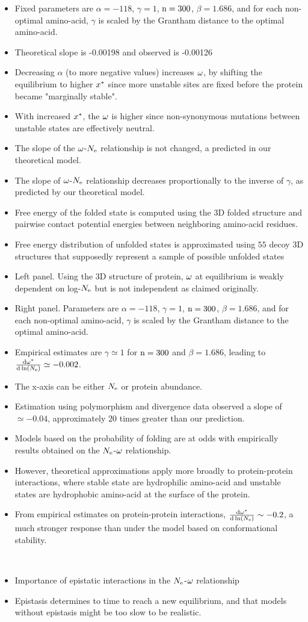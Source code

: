 \documentclass{article}
\begin{document}
\newpage
\begin{itemize}
	\item Fixed parameters are $\alpha=-118$, $\gamma=1$, $\text{n}=300$, $\beta=1.686$, and for each non-optimal amino-acid, $\gamma$ is scaled by the Grantham distance to the optimal amino-acid.
	\item Theoretical slope is -0.00198 and observed is -0.00126
	\item Decreasing $\alpha$ (to more negative values) increases $\omega$, by shifting the equilibrium to higher $x^{*}$ since more unstable sites are fixed before the protein became "marginally stable".  
	\item With increased $x^{*}$, the $\omega$ is higher since non-synonymous mutations between unstable states are effectively neutral.
	\item The slope of the $\omega$-$N_{\mathrm{e}}$ relationship is not changed, a predicted in our theoretical model.
	\item The slope of $\omega$-$N_{\mathrm{e}}$ relationship decreases proportionally to the inverse of $\gamma$, as predicted by our theoretical model.
	\item Free energy of the folded state is computed using the $3$D folded structure and pairwise contact potential energies between neighboring amino-acid residues.
	\item Free energy distribution of unfolded states is approximated using $55$ decoy $3$D structures that supposedly represent a sample of possible unfolded states
	\item Left panel. Using the 3D structure of protein, $\omega$ at equilibrium is weakly dependent on log-$N_{\mathrm{e}}$ but is not independent as claimed originally.
	\item Right panel. Parameters are $\alpha=-118$, $\gamma=1$, $\text{n}=300$, $\beta=1.686$, and for each non-optimal amino-acid, $\gamma$ is scaled by the Grantham distance to the optimal amino-acid.
	\item Empirical estimates are $\gamma \simeq 1$ for $\text{n}=300$ and $\beta=1.686$, leading to $\frac{ \mathrm{d} \omega^{*}}{\mathrm{d} \ln (N_{\mathrm{e}})} \simeq -0.002$.
	\item The x-axis can be either $N_{\mathrm{e}}$ or protein abundance.
	\item Estimation using polymorphism and divergence data observed a slope of $\simeq -0.04$, approximately $20$ times greater than our prediction. 
	\item Models based on the probability of folding are at odds with empirically results obtained on the $N_{\mathrm{e}}$-$\omega$ relationship.
	\item However, theoretical approximations apply more broadly to protein-protein interactions, where stable state are hydrophilic amino-acid and unstable states are hydrophobic amino-acid at the surface of the protein.
	\item From empirical estimates on protein-protein interactions, $\frac{ \mathrm{d} \omega^{*}}{\mathrm{d} \ln (N_{\mathrm{e}})} \sim -0.2$, a much stronger response than under the model based on conformational stability.
\end{itemize}
\newpage
~\\
\begin{itemize}
	\item Importance of epistatic interactions in the $N_{\mathrm{e}}$-$\omega$ relationship
	\item Epistasis determines to time to reach a new equilibrium, and that models without epistasis might be too slow to be realistic.
\end{itemize}
\end{document}

